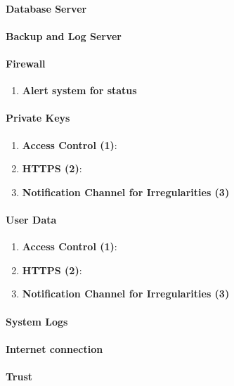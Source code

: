\documentclass[english]{article}
\begin{document}
\paragraph{Database Server}

\paragraph{Backup and Log Server}

\paragraph{Firewall}   
\begin{enumerate}[label=(\alph*)] 
	\item \textbf{Alert system for status} 
\end{enumerate}

\paragraph{Private Keys}
\begin{enumerate}[label=(\alph*)]
\item \textbf{Access Control (1)}:
\item \textbf{HTTPS (2)}:
\item \textbf{Notification Channel for Irregularities (3)}
\end{enumerate} 

\paragraph{User Data}
\begin{enumerate}[label=(\alph*)]
\item \textbf{Access Control (1)}:
\item \textbf{HTTPS (2)}:
\item \textbf{Notification Channel for Irregularities (3)}
\end{enumerate}

\paragraph{System Logs} 

\paragraph{Internet connection} 

\paragraph{Trust} 
\end{document}

